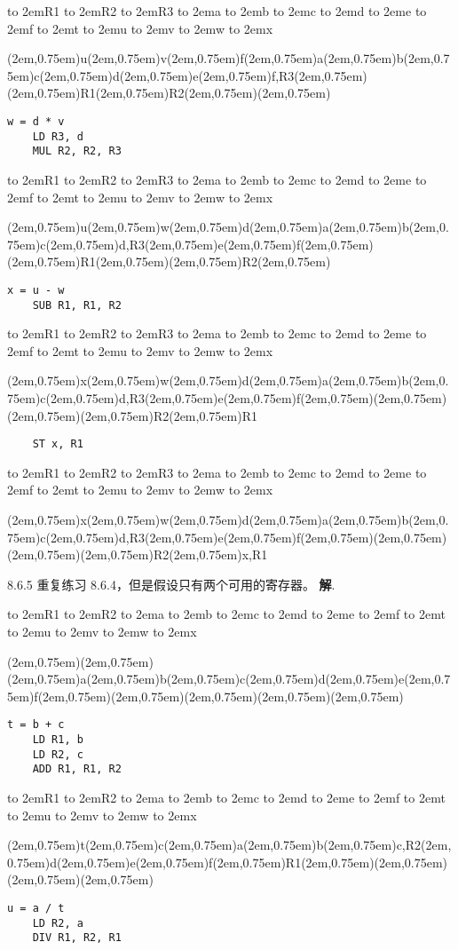 \documentclass[a4paper]{article}
\newenvironment{problems}{\begin{list}{}{\renewcommand{\makelabel}[1]{\textbf{##1}\hfil}}}{\end{list}}
\providecommand{\sol}{\textbf{解}.~}
\def\slot#1{\framebox(2em,0.75em){#1}}
\def\lab#1{\hbox to 2em{\hfil #1 \hfil}}
\def\heading{\hfill \lab{R1}\lab{R2}\lab{R3}\hspace*{2em}\lab{a}\lab{b}\lab{c}\lab{d}\lab{e}\lab{f}\lab{t}\lab{u}\lab{v}\lab{w}\lab{x}}
\def\headingtwo{\hfill \lab{R1}\lab{R2}\hspace*{2em}\lab{a}\lab{b}\lab{c}\lab{d}\lab{e}\lab{f}\lab{t}\lab{u}\lab{v}\lab{w}\lab{x}}
\begin{document}
\begin{problems}
{        \heading

        \hfill \slot{u}\slot{v}\slot{f}\hspace*{2em}\slot{a}\slot{b}\slot{c}\slot{d}\slot{e}\slot{f,R3}\slot{}\slot{R1}\slot{R2}\slot{}\slot{}

        \begin{verbatim}
w = d * v
    LD R3, d
    MUL R2, R2, R3
        \end{verbatim}

        \heading

        \hfill \slot{u}\slot{w}\slot{d}\hspace*{2em}\slot{a}\slot{b}\slot{c}\slot{d,R3}\slot{e}\slot{f}\slot{}\slot{R1}\slot{}\slot{R2}\slot{}

 \begin{verbatim}
x = u - w
    SUB R1, R1, R2
\end{verbatim}
    
        \heading

        \hfill \slot{x}\slot{w}\slot{d}\hspace*{2em}\slot{a}\slot{b}\slot{c}\slot{d,R3}\slot{e}\slot{f}\slot{}\slot{}\slot{}\slot{R2}\slot{R1}

\begin{verbatim}
    ST x, R1
\end{verbatim}

        \heading

        \hfill \slot{x}\slot{w}\slot{d}\hspace*{2em}\slot{a}\slot{b}\slot{c}\slot{d,R3}\slot{e}\slot{f}\slot{}\slot{}\slot{}\slot{R2}\slot{x,R1}
}
    \item[8.6.5] 重复练习 8.6.4，但是假设只有两个可用的寄存器。
    \sol

{\ttfamily

\headingtwo

\hfill \slot{}\slot{}\hspace*{2em}\slot{a}\slot{b}\slot{c}\slot{d}\slot{e}\slot{f}\slot{}\slot{}\slot{}\slot{}\slot{}

\begin{verbatim}
t = b + c
    LD R1, b
    LD R2, c
    ADD R1, R1, R2
\end{verbatim}

\headingtwo

\hfill \slot{t}\slot{c}\hspace*{2em}\slot{a}\slot{b}\slot{c,R2}\slot{d}\slot{e}\slot{f}\slot{R1}\slot{}\slot{}\slot{}\slot{}

\begin{verbatim}
u = a / t
    LD R2, a
    DIV R1, R2, R1
\end{verbatim}

}
\end{problems}
\end{document}
